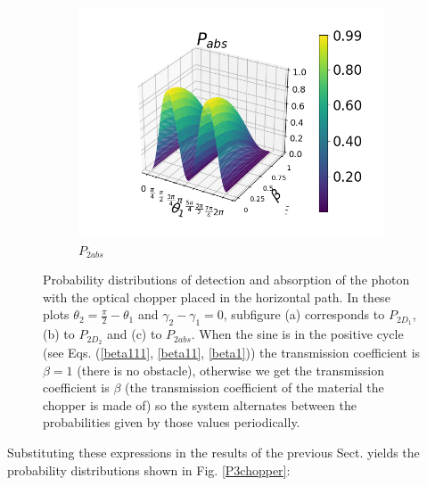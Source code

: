 \documentclass[12pt]{book}
\begin{document}
\begin{figure}[t!]
\begin{subfigure}[b]{0.4\linewidth}
\includegraphics[width=\linewidth]{images/PAbs_v.png}
\caption{$P_{2abs}$}
\label{fig:BS1}
\end{subfigure}
\caption{Probability distributions of detection and absorption of the photon with the optical chopper placed in the horizontal path. In these plots $\theta_{2}=\frac{\pi}{2}-\theta_{1}$ and $\gamma_{2}-\gamma_{1}=0$, subfigure (a) corresponds to $P_{2D_{1}}$, (b) to $P_{2D_{2}}$ and (c) to $P_{2abs}$. When the sine is in the positive cycle (see Eqs. (\ref{beta111}, \ref{beta11}, \ref{beta1})) the transmission coefficient is $\beta=1$ (there is no obstacle), otherwise we get the transmission coefficient is $\beta$ (the transmission coefficient of the material the chopper is made of) so the system alternates between the probabilities given by those values periodically.}
\label{P4chopper}
\end{figure}

Substituting these expressions in the results of the previous Sect. yields the probability distributions shown in Fig. \ref{P3chopper}:
\end{document}
